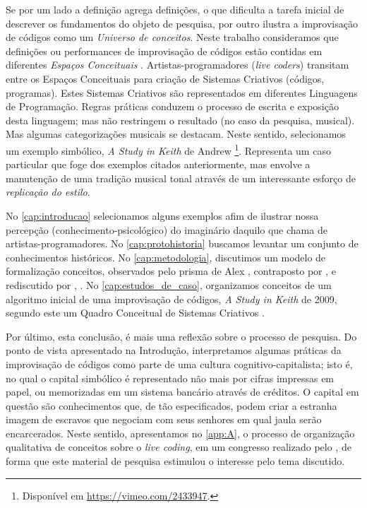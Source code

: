 Se por um lado a definição agrega definições, o que dificulta a tarefa inicial de descrever os fundamentos do objeto de pesquisa, por outro ilustra a improvisação de códigos como um \emph{Universo de conceitos}. Neste trabalho consideramos que definições ou performances de improvisação de códigos estão contidas em diferentes \emph{Espaços Conceituais} \cite{wiggins_framework_2006,mclean_music_2006}. Artistas-programadores (\emph{live coders}) transitam entre os Espaços Conceituais para criação de Sistemas Criativos (códigos, programas). Estes Sistemas Criativos são representados em diferentes Linguagens de Programação. Regras práticas conduzem o processo de escrita e exposição desta linguagem; mas não restringem o resultado (no caso da pesquisa, musical). Mas algumas categorizações musicais se destacam.  Neste sentido, selecionamos um exemplo simbólico, \emph{A Study in Keith} de Andrew \footnote{Disponível em \url{https://vimeo.com/2433947}.}. Representa um caso particular que foge dos exemplos citados anteriormente, mas envolve a manutenção de uma tradição musical tonal através de um interessante esforço de \emph{replicação do estilo}. 

No \autoref{cap:introducao} selecionamos alguns exemplos afim de ilustrar nossa percepção (conhecimento-psicológico) do imaginário daquilo que  chama de artistas-programadores. No \autoref{cap:protohistoria} buscamos levantar um conjunto de conhecimentos históricos. No \autoref{cap:metodologia}, discutimos um modelo de formalização conceitos, observados pelo prisma de Alex , contraposto por , e rediscutido por , . No \autoref{cap:estudos_de_caso}, organizamos conceitos de um algoritmo inicial de uma improvisação de códigos, \emph{A Study in Keith} de 2009, segundo este um Quadro Conceitual de Sistemas Criativos . 

Por último, esta conclusão, é mais uma reflexão sobre o processo de pesquisa. Do ponto de vista apresentado na Introdução, interpretamos algumas práticas da improvisação de códigos como parte de uma cultura cognitivo-capitalista; isto é, no qual o capital simbólico é representado não mais por cifras impressas em papel, ou memorizadas em um sistema bancário através de créditos. O capital em questão são conhecimentos que, de tão especificados, podem criar a estranha imagem de escravos que negociam com seus senhores em qual jaula serão encarcerados. Neste sentido, apresentamos no \autoref{app:A}, o processo de organização qualitativa de conceitos sobre o \emph{live coding}, em um congresso realizado pelo , de forma que este material de pesquisa estimulou o interesse pelo tema discutido.